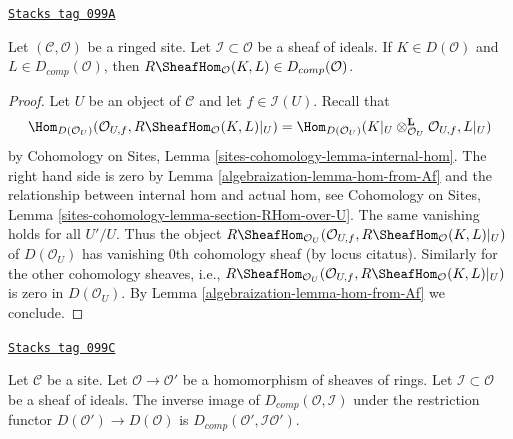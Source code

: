 \begin{lemma}
\label{algebraization-lemma-derived-complete-internal-hom}
\href{https://stacks.math.columbia.edu/tag/099A}{\texttt{Stacks tag 099A}}

Let $(\mathcal{C}, \mathcal{O})$ be a ringed site.
Let $\mathcal{I} \subset \mathcal{O}$ be a sheaf of ideals.
If $K \in D(\mathcal{O})$ and $L \in D_{comp}(\mathcal{O})$, then
$R\SheafHom_\mathcal{O}(K, L) \in D_{comp}(\mathcal{O})$.
\end{lemma}

\begin{proof}

Let $U$ be an object of $\mathcal{C}$ and let $f \in \mathcal{I}(U)$.
Recall that
$$
\Hom_{D(\mathcal{O}_U)}(\mathcal{O}_{U, f}, R\SheafHom_\mathcal{O}(K, L)|_U)
=
\Hom_{D(\mathcal{O}_U)}(
K|_U \otimes_{\mathcal{O}_U}^\mathbf{L} \mathcal{O}_{U, f}, L|_U)
$$
by Cohomology on Sites, Lemma \ref{sites-cohomology-lemma-internal-hom}.
The right hand side is zero by Lemma \ref{algebraization-lemma-hom-from-Af}
and the relationship between internal hom and actual hom, see
Cohomology on Sites, Lemma \ref{sites-cohomology-lemma-section-RHom-over-U}.
The same vanishing holds for all $U'/U$. Thus the object
$R\SheafHom_{\mathcal{O}_U}(\mathcal{O}_{U, f},
R\SheafHom_\mathcal{O}(K, L)|_U)$ of $D(\mathcal{O}_U)$ has vanishing
$0$th cohomology sheaf (by locus citatus). Similarly for the other
cohomology sheaves, i.e., $R\SheafHom_{\mathcal{O}_U}(\mathcal{O}_{U, f},
R\SheafHom_\mathcal{O}(K, L)|_U)$ is zero in $D(\mathcal{O}_U)$.
By Lemma \ref{algebraization-lemma-hom-from-Af} we conclude.
\end{proof}

\begin{lemma}
\label{algebraization-lemma-restriction-derived-complete}
\href{https://stacks.math.columbia.edu/tag/099C}{\texttt{Stacks tag 099C}}

Let $\mathcal{C}$ be a site. Let $\mathcal{O} \to \mathcal{O}'$
be a homomorphism of sheaves of rings. Let $\mathcal{I} \subset \mathcal{O}$
be a sheaf of ideals. The inverse image of $D_{comp}(\mathcal{O}, \mathcal{I})$
under the restriction functor $D(\mathcal{O}') \to D(\mathcal{O})$ is
$D_{comp}(\mathcal{O}', \mathcal{I}\mathcal{O}')$.
\end{lemma}

